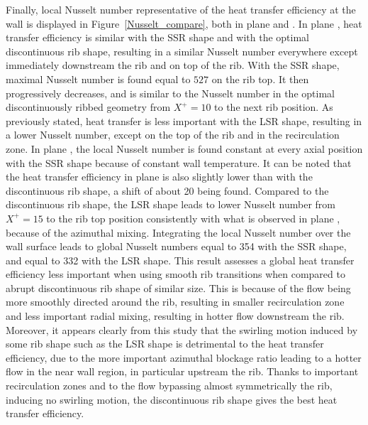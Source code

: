Finally, local Nusselt number representative of the heat transfer efficiency at the wall is displayed in Figure~\ref{Nusselt_compare}, both in plane  and . In plane , heat transfer efficiency is similar with the SSR shape and with the optimal discontinuous rib shape, resulting in a similar Nusselt number everywhere except immediately downstream the rib and on top of the rib. With the SSR shape, maximal Nusselt number is found equal to $527$ on the rib top. It then progressively decreases, and is similar to the Nusselt number in the optimal discontinuously ribbed geometry from $X^+=10$ to the next rib position. As previously stated, heat transfer is less important with the LSR shape, resulting in a lower Nusselt number, except on the top of the rib and in the recirculation zone. In plane , the local Nusselt number is found constant at every axial position with the SSR shape because of constant wall temperature. It can be noted that the heat transfer efficiency in plane  is also slightly lower than with the discontinuous rib shape, a shift of about 20 being found. Compared to the discontinuous rib shape, the LSR shape leads to lower Nusselt number from $X^+=15$ to the rib top position consistently with what is observed in plane , because of the azimuthal mixing. Integrating the local Nusselt number over the wall surface leads to global Nusselt numbers equal to 354 with the SSR shape, and equal to 332 with the LSR shape. This result assesses a global heat transfer efficiency less important when using smooth rib transitions when compared to abrupt discontinuous rib shape of similar size. This is because of the flow being more smoothly directed around the rib, resulting in smaller recirculation zone and less important radial mixing, resulting in hotter flow downstream the rib. Moreover, it appears clearly from this study that the swirling motion induced by some rib shape such as the LSR shape is detrimental to the heat transfer efficiency, due to the more important azimuthal blockage ratio leading to a hotter flow in the near wall region, in particular upstream the rib. Thanks to important recirculation zones and to the flow bypassing almost symmetrically the rib, inducing no swirling motion, the discontinuous rib shape gives the best heat transfer efficiency.\\

